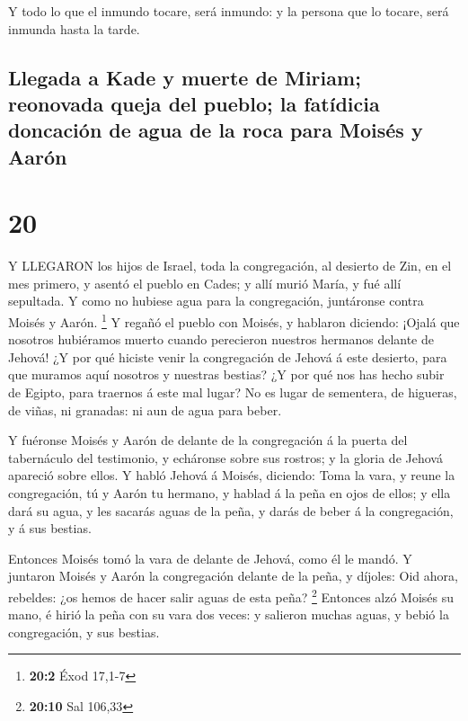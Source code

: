  Y todo lo que el inmundo tocare, será inmundo: y la
persona que lo tocare, será inmunda hasta la tarde.

\hypertarget{llegada-a-kade-y-muerte-de-miriam-reonovada-queja-del-pueblo-la-fatuxeddicia-doncaciuxf3n-de-agua-de-la-roca-para-moisuxe9s-y-aaruxf3n}{%
\subsection{Llegada a Kade y muerte de Miriam; reonovada queja del
pueblo; la fatídicia doncación de agua de la roca para Moisés y
Aarón}\label{llegada-a-kade-y-muerte-de-miriam-reonovada-queja-del-pueblo-la-fatuxeddicia-doncaciuxf3n-de-agua-de-la-roca-para-moisuxe9s-y-aaruxf3n}}

\hypertarget{section-19}{%
\section{20}\label{section-19}}

 Y LLEGARON los hijos de Israel, toda la congregación, al
desierto de Zin, en el mes primero, y asentó el pueblo en Cades; y allí
murió María, y fué allí sepultada.  Y como no hubiese agua
para la congregación, juntáronse contra Moisés y Aarón. \footnote{\textbf{20:2}
  Éxod 17,1-7}  Y regañó el pueblo con Moisés, y hablaron
diciendo: ¡Ojalá que nosotros hubiéramos muerto cuando perecieron
nuestros hermanos delante de Jehová!  ¿Y por qué hiciste
venir la congregación de Jehová á este desierto, para que muramos aquí
nosotros y nuestras bestias?  ¿Y por qué nos has hecho subir
de Egipto, para traernos á este mal lugar? No es lugar de sementera, de
higueras, de viñas, ni granadas: ni aun de agua para beber.

 Y fuéronse Moisés y Aarón de delante de la congregación á
la puerta del tabernáculo del testimonio, y echáronse sobre sus rostros;
y la gloria de Jehová apareció sobre ellos.  Y habló Jehová
á Moisés, diciendo:  Toma la vara, y reune la congregación,
tú y Aarón tu hermano, y hablad á la peña en ojos de ellos; y ella dará
su agua, y les sacarás aguas de la peña, y darás de beber á la
congregación, y á sus bestias.

 Entonces Moisés tomó la vara de delante de Jehová, como él
le mandó.  Y juntaron Moisés y Aarón la congregación
delante de la peña, y díjoles: Oid ahora, rebeldes: ¿os hemos de hacer
salir aguas de esta peña? \footnote{\textbf{20:10} Sal 106,33}
 Entonces alzó Moisés su mano, é hirió la peña con su vara
dos veces: y salieron muchas aguas, y bebió la congregación, y sus
bestias.

